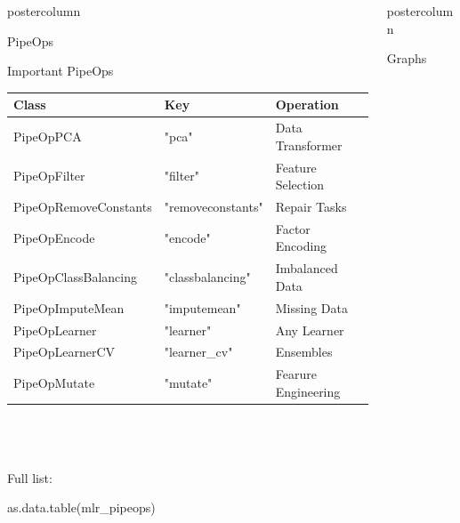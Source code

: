 \documentclass{beamer}
\newlength{\columnheight} %
\newcommand{\codeinline}[1]{\begin{codeboxinline}#1\end{codeboxinline}}
\begin{document}
\begin{frame}[fragile]{}
\begin{columns}
\begin{column}{.245\textwidth}
\begin{beamercolorbox}[center]{postercolumn}
\begin{minipage}{.98\textwidth}
{\begin{myblock}{PipeOps}
\begin{itemize}
              \end{itemize}
  			\end{myblock}
            \begin{myblock}{Important PipeOps}
              \begin{footnotesize}
                \begin{centering}
                  \begin{tabular}{l l l}
                    \textbf{Class} & \textbf{Key} & \textbf{Operation} \\ \hline
                    PipeOpPCA & "pca" & Data Transformer\\
                    PipeOpFilter & "filter" & Feature Selection\\
                    PipeOpRemoveConstants & "removeconstants" & Repair Tasks\\
                    PipeOpEncode & "encode" & Factor Encoding\\
                    PipeOpClassBalancing & "classbalancing" & Imbalanced Data\\
                    PipeOpImputeMean & "imputemean" & Missing Data\\
                    PipeOpLearner & "learner" & Any Learner\\
                    PipeOpLearnerCV & "learner\_cv" & Ensembles\\
                    PipeOpMutate & "mutate" & Fearure Engineering\\ \hline
                  \end{tabular}
                \end{centering}
              \end{footnotesize}
              \ \\
              \ \\
              \ \\
              Full list: \codeinline{as.data.table(mlr\_pipeops)}
						\end{myblock}
						\vfill}
				\end{minipage}
			\end{beamercolorbox}
		\end{column}
		\begin{column}{.245\textwidth}
			\begin{beamercolorbox}[center]{postercolumn}
				\begin{minipage}{.98\textwidth}
					\parbox[t][\columnheight]{\textwidth}{
						\begin{myblock}{Graphs}

\end{myblock}}
\end{minipage}
\end{beamercolorbox}
\end{column}
\end{columns}
\end{frame}
\end{document}
